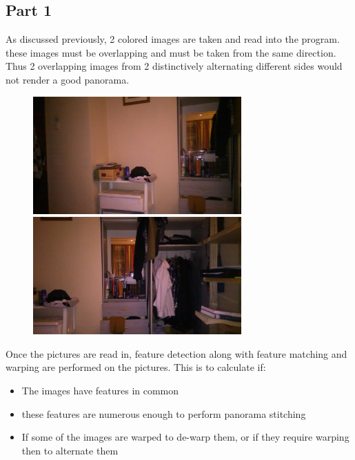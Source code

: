 \documentclass{article}
\begin{document}
\subsection{Part 1}\label{sec:overview}

As discussed previously, 2 colored images are taken and read into the program. these images must be overlapping and must be taken from the same direction. Thus 2 overlapping images from 2 distinctively alternating different sides would not render a good panorama.
\begin{figure}[H]
	\centering
	\includegraphics[width=8cm]{p1.jpg}
	\includegraphics[width=8cm]{p2.jpg}

\end{figure}

Once the pictures are read in, feature detection along with feature matching and warping are performed on the pictures. This is to calculate if:
\begin{itemize}
	\item The images have features in common
	\item these features are numerous enough to perform panorama stitching
	\item If some of the images are warped to de-warp them, or if they require warping then to alternate them
	
\end{itemize}
\end{document}
